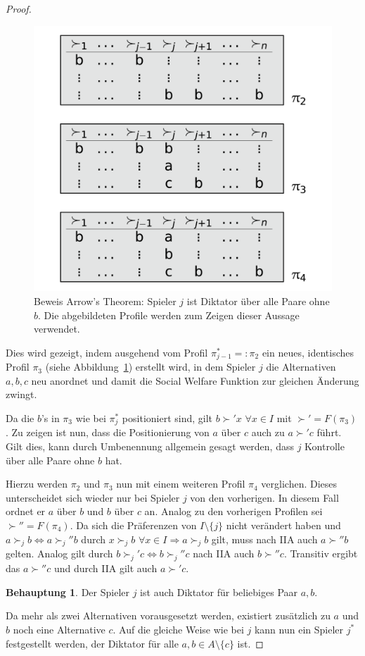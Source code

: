 \documentclass[a4paper,11pt]{article}
\theoremstyle{definition}
\theoremstyle{plain}
\theoremstyle{definition}
\newtheorem{claim}{Behauptung}
\begin{document}
\begin{proof}
	\begin{figure}
		\centering
		\includegraphics[width=.5\textwidth]{img/arrow(3).pdf}
		\caption{Beweis Arrow's Theorem: Spieler $j$ ist Diktator über alle Paare ohne $b$. Die abgebildeten Profile werden zum Zeigen dieser Aussage verwendet.}
		\label{fig:arr3}
	\end{figure}

	Dies wird gezeigt, indem ausgehend vom Profil $\pi_{j-1}^* =: \pi_2$ ein neues, identisches Profil $\pi_3$ (siehe Abbildung~\ref{fig:arr3}) erstellt wird, in dem Spieler $j$ die Alternativen $a,b,c$ neu anordnet und damit die Social Welfare Funktion zur gleichen Änderung zwingt.
	
	Da die $b$'s in $\pi_3$ wie bei $\pi_{j}^*$ positioniert sind, gilt $b \succ' x$ $\forall x \in I$ mit $\succ' = F(\pi_3)$. Zu zeigen ist nun, dass die Positionierung von $a$ über $c$ auch zu $a \succ' c$ führt. Gilt dies, kann durch Umbenennung allgemein gesagt werden, dass $j$ Kontrolle über alle Paare ohne $b$ hat.
	
	Hierzu werden $\pi_2$ und $\pi_3$ nun mit einem weiteren Profil $\pi_4$ verglichen. Dieses unterscheidet sich wieder nur bei Spieler $j$ von den vorherigen. In diesem Fall ordnet er $a$ über $b$ und $b$ über $c$ an. Analog zu den vorherigen Profilen sei $\succ'' = F(\pi_4)$. Da sich die Präferenzen von $I \setminus \{j\}$ nicht verändert haben und $a \succ_j b \iff a \succ_j'' b$ durch $x \succ_j b$ $\forall x \in I \Rightarrow a \succ_j b$ gilt, muss nach IIA auch $a \succ'' b$ gelten. Analog gilt durch $b \succ_j' c \iff b \succ_j'' c$ nach IIA auch $b \succ'' c$. Transitiv ergibt das $a \succ'' c$ und durch IIA gilt auch $a \succ' c$.
	
	\begin{claim}
		Der Spieler $j$ ist auch Diktator für beliebiges Paar $a, b$.
	\end{claim}

	Da mehr als zwei Alternativen vorausgesetzt werden, existiert zusätzlich zu $a$ und $b$ noch eine Alternative $c$. Auf die gleiche Weise wie bei $j$ kann nun ein Spieler $j^*$ festgestellt werden, der Diktator für alle $a, b \in A \setminus \{c\}$ ist.
	

\end{proof}
\end{document}
